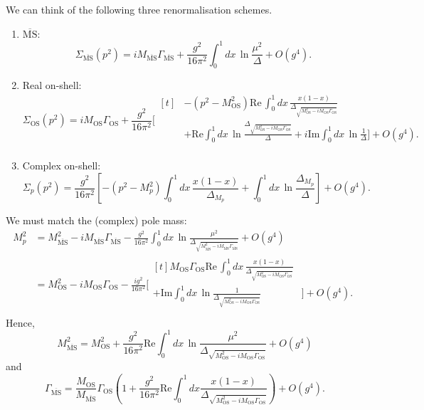 \documentclass[11pt]{article}
\theoremstyle{definition}
\theoremstyle{remark}
\begin{document}
	We can think of the following three renormalisation schemes.
	\begin{enumerate}
		\item $\overline{\mathrm{MS}}$:
		\[\Sigma_{\overline{\mathrm{MS}}}(p^{2})=iM_{\overline{\mathrm{MS}}}\Gamma_{\overline{\mathrm{MS}}}+\frac{g^{2}}{16\pi^{2}}\int_{0}^{1}dx\,\ln\frac{\mu^{2}}{\Delta}+O(g^{4}).\]
		
		\item Real on-shell:
		\[\Sigma_{\mathrm{OS}}(p^{2})=iM_{\mathrm{OS}}\Gamma_{\mathrm{OS}}+\frac{g^{2}}{16\pi^{2}}\bigg[\begin{aligned}[t]
			&-(p^{2}-M_{\mathrm{OS}}^{2})\mathrm{Re}\,\int_{0}^{1}dx\,\frac{x(1-x)}{\Delta_{\sqrt{M_{\mathrm{OS}}^{2}-iM_{\mathrm{OS}}\Gamma_{\mathrm{OS}}}}}\\
			&+\mathrm{Re}\int_{0}^{1}dx\,\ln\frac{\Delta_{\sqrt{M_{\mathrm{OS}}^{2}-iM_{\mathrm{OS}}\Gamma_{\mathrm{OS}}}}}{\Delta}+i\mathrm{Im}\int_{0}^{1}dx\,\ln\frac{1}{\Delta}\bigg]+O(g^{4}).\\
		\end{aligned}\]
		
		\item Complex on-shell:
		\[\Sigma_{p}(p^{2})=\frac{g^{2}}{16\pi^{2}}\left[-(p^{2}-M_{p}^{2})\int_{0}^{1}dx\,\frac{x(1-x)}{\Delta_{M_{p}}}+\int_{0}^{1}dx\,\ln\frac{\Delta_{M_{p}}}{\Delta}\right]+O(g^{4}).\]
	\end{enumerate}
	We must match the (complex) pole mass:
	\begin{align*}
		M_{p}^{2}&=M_{\overline{\mathrm{MS}}}^{2}-iM_{\overline{\mathrm{MS}}}\Gamma_{\overline{\mathrm{MS}}}-\frac{g^{2}}{16\pi^{2}}\int_{0}^{1}dx\,\ln\frac{\mu^{2}}{\Delta_{\sqrt{M_{\overline{\mathrm{MS}}}^{2}-iM_{\overline{\mathrm{MS}}}\Gamma_{\overline{\mathrm{MS}}}}}}+O(g^{4})\\
		&=M_{\mathrm{OS}}^{2}-iM_{\mathrm{OS}}\Gamma_{\mathrm{OS}}-\frac{ig^{2}}{16\pi^{2}}\bigg[\begin{aligned}[t]
			M_{\mathrm{OS}}\Gamma_{\mathrm{OS}}\mathrm{Re}\,\int_{0}^{1}dx\,\frac{x(1-x)}{\Delta_{\sqrt{M_{\mathrm{OS}}^{2}-iM_{\mathrm{OS}}\Gamma_{\mathrm{OS}}}}}&\\
			+\mathrm{Im}\int_{0}^{1}dx\,\ln\frac{1}{\Delta_{\sqrt{M_{\mathrm{OS}}^{2}-iM_{\mathrm{OS}}\Gamma_{\mathrm{OS}}}}}&\bigg]+O(g^{4}).\\
		\end{aligned}
	\end{align*}
	Hence,
	\[M_{\overline{\mathrm{MS}}}^{2}=M_{\mathrm{OS}}^{2}+\frac{g^{2}}{16\pi^{2}}\mathrm{Re}\int_{0}^{1}dx\,\ln\frac{\mu^{2}}{\Delta_{\sqrt{M_{\mathrm{OS}}^{2}-iM_{\mathrm{OS}}\Gamma_{\mathrm{OS}}}}}+O(g^{4})\]
	and
	\[\Gamma_{\overline{\mathrm{MS}}}=\frac{M_{\mathrm{OS}}}{M_{\overline{\mathrm{MS}}}}\Gamma_{\mathrm{OS}}\left(1+\frac{g^{2}}{16\pi^{2}}\mathrm{Re}\int_{0}^{1}dx\frac{x(1-x)}{\Delta_{\sqrt{M_{\mathrm{OS}}^{2}-iM_{\mathrm{OS}}\Gamma_{\mathrm{OS}}}}}\right)+O(g^{4}).\]
	
\end{document}
